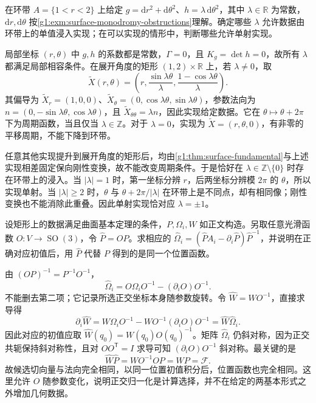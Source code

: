 \begin{exercise}
	\label{g1:ex:annulus-cylinder-period}
	在环带 \(A=\{1<r<2\}\) 上给定 \(g=\mathrm{d}r^2+\mathrm{d}\theta^2\)、\(h=\lambda\,\mathrm{d}\theta^2\)，其中 \(\lambda\in\mathbb R\) 为常数，\(\mathrm{d}r,\mathrm{d}\theta\) 按\cref{g1:exm:surface-monodromy-obstructions}理解。确定哪些 \(\lambda\) 允许数据由环带上的单值浸入实现；在可以实现的情形中，判断哪些允许单射实现。
\end{exercise}

\begin{solution}
	局部坐标 \((r,\theta)\) 中 \(g,h\) 的系数都是常数，\(\Gamma=0\)，且 \(K_g=\det h=0\)，故所有 \(\lambda\) 都满足局部相容条件。在展开角度的矩形 \((1,2)\times\mathbb R\) 上，若 \(\lambda\ne0\)，取
	\[
		\widetilde X(r,\theta)=
		\left(r,\frac{\sin\lambda\theta}{\lambda},
		\frac{1-\cos\lambda\theta}{\lambda}\right).
	\]
	其偏导为 \(\widetilde X_r=(1,0,0)\)、\(\widetilde X_\theta=(0,\cos\lambda\theta,\sin\lambda\theta)\)，参数法向为 \(n=(0,-\sin\lambda\theta,\cos\lambda\theta)\)，且 \(\widetilde X_{\theta\theta}=\lambda n\)，因此实现给定数据。它在 \(\theta\mapsto\theta+2\pi\) 下为周期函数，当且仅当 \(\lambda\in\mathbb Z\)。对于 \(\lambda=0\)，实现为 \(\widetilde X=(r,\theta,0)\)，有非零的平移周期，不能下降到环带。

	任意其他实现提升到展开角度的矩形后，均由\cref{g1:thm:surface-fundamental}与上述实现相差固定保向刚性变换，故不能改变周期条件。于是恰好在 \(\lambda\in\mathbb Z\setminus\{0\}\) 时存在环带上的浸入。当 \(|\lambda|=1\) 时，第一坐标分辨 \(r\)，后两坐标分辨模 \(2\pi\) 的 \(\theta\)，所以实现单射。当 \(|\lambda|\geq2\) 时，\(\theta\) 与 \(\theta+2\pi/|\lambda|\) 在环带上是不同点，却有相同像；刚性变换也不能消除此重叠。因此单射实现恰对应 \(\lambda=\pm1\)。
\end{solution}

\begin{exercise}
	\label{g1:ex:surface-frame-choice}
	设矩形上的数据满足曲面基本定理的条件，\(P,\Omega_i,W\) 如正文构造。另取任意光滑函数 \(O\colon V\rightarrow \operatorname{SO}(3)\)，令 \(\widehat P=OP\)。求相应的 \(\widehat\Omega_i=(\widehat P A_i-\partial_i\widehat P)\widehat P^{-1}\)，并说明在正确对应初值后，用 \(\widehat P\) 代替 \(P\) 得到的是同一个位置函数。
\end{exercise}

\begin{solution}
	由 \((OP)^{-1}=P^{-1}O^{-1}\)，
	\[
		\widehat\Omega_i=O\Omega_iO^{-1}-(\partial_iO)O^{-1}.
	\]
	不能删去第二项；它记录所选正交坐标本身随参数旋转。令 \(\widehat W=WO^{-1}\)，直接求导得
	\[
		\partial_i\widehat W
		=W\Omega_iO^{-1}-WO^{-1}(\partial_iO)O^{-1}
		=\widehat W\widehat\Omega_i.
	\]
	因此对应的初值应取 \(\widehat W(q_0)=W(q_0)O(q_0)^{-1}\)。矩阵 \(\widehat\Omega_i\) 仍斜对称，因为正交共轭保持斜对称性，且对 \(OO^{\mathsf T}=I\) 求导可知 \((\partial_iO)O^{-1}\) 斜对称。最关键的是
	\[
		\widehat W\widehat P=WO^{-1}OP=WP=\mathcal F.
	\]
	故候选切向量与法向完全相同，以同一位置初值积分后，位置函数也完全相同。这里允许 \(O\) 随参数变化，说明正交归一化是计算选择，并不在给定的两基本形式之外增加几何数据。
\end{solution}

